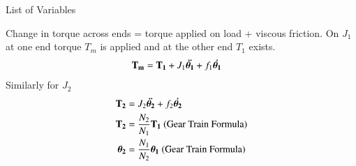 \begin{table}[!ht]
\centering

\caption{List of Variables}
\label{table:ee18btech11001_3}
\end{table}
Change in torque across ends = torque applied on load + viscous friction. On $J_{1}$ at one end torque $T_{m}$ is applied and at the other end $T_{1}$ exists.
\begin{align}
    \mathbf{T_{m}} &= \mathbf{T_{1}} + J_{1}\bm{\Ddot{\theta_{1}}} + f_{1}\bm{\Dot{\theta_{1}}} 
    \label{eq:ee18btech11001_2}
\end{align}
Similarly for $J_{2}$
\begin{align}
    \mathbf{T_{2}} &=  J_{2}\bm{\Ddot{\theta_{2}}} + f_{2}\bm{\Dot{\theta_{2}}} 
    \label{eq:ee18btech11001_3}
    \\
    \mathbf{T_{2}} &= \frac{N_{2}}{N_{1}} \mathbf{T_{1}} \text{ (Gear Train Formula)} \label{eq:ee18btech11001_4}
    \\
    \bm{\theta_{2}} &= \frac{N_{1}}{N_{2}} \bm{\theta_{1}} \text{ (Gear Train Formula)} \label{eq:ee18btech11001_5}
\end{align}
    
